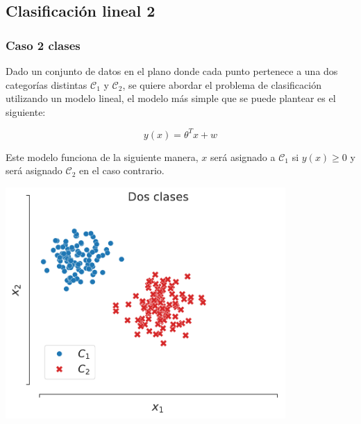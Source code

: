 


\subsection{Clasificación lineal 2}


\subsubsection{Caso 2 clases}

\begin{minipage}{0.4\textwidth}
    Dado un conjunto de datos en el plano donde cada punto pertenece a una dos categorías distintas $\mathcal{C}_1$ y $\mathcal{C}_2$, se quiere abordar el problema de clasificación utilizando un modelo lineal, el modelo más simple que se puede plantear es el siguiente:
    
    \begin{equation}
        y(x) = \theta^Tx + w
    \end{equation}
    
    Este modelo funciona de la siguiente manera, $x$ será asignado a $\mathcal{C}_1$ si $y(x) \geq 0$ y será asignado $\mathcal{C}_2$ en el caso contrario.
\end{minipage}\hfill
\begin{minipage}{0.5\textwidth}
    \centering
    \includegraphics[width=0.8\textwidth]{img/cap2_dosclases}\\
    \label{fig:puntos_2d}
\end{minipage}

